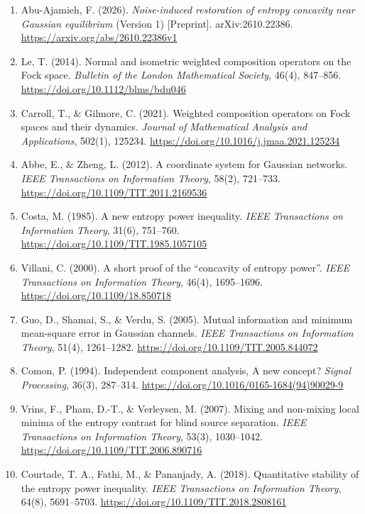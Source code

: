 \documentclass[
  british,
  10pt,
]{article}
\begin{document}
\begin{enumerate}
\item
  Abu-Ajamieh, F. (2026). \emph{Noise-induced restoration of entropy
  concavity near Gaussian equilibrium} (Version 1) {[}Preprint{]}.
  arXiv:2610.22386. \url{https://arxiv.org/abs/2610.22386v1}
\item
  Le, T. (2014). Normal and isometric weighted composition operators on
  the Fock space. \emph{Bulletin of the London Mathematical Society},
  46(4), 847--856. \url{https://doi.org/10.1112/blms/bdu046}
\item
  Carroll, T., \& Gilmore, C. (2021). Weighted composition operators on
  Fock spaces and their dynamics. \emph{Journal of Mathematical Analysis
  and Applications}, 502(1), 125234.
  \url{https://doi.org/10.1016/j.jmaa.2021.125234}
\item
  Abbe, E., \& Zheng, L. (2012). A coordinate system for Gaussian
  networks. \emph{IEEE Transactions on Information Theory}, 58(2),
  721--733. \url{https://doi.org/10.1109/TIT.2011.2169536}
\item
  Costa, M. (1985). A new entropy power inequality. \emph{IEEE
  Transactions on Information Theory}, 31(6), 751--760.
  \url{https://doi.org/10.1109/TIT.1985.1057105}
\item
  Villani, C. (2000). A short proof of the ``concavity of entropy
  power''. \emph{IEEE Transactions on Information Theory}, 46(4),
  1695--1696. \url{https://doi.org/10.1109/18.850718}
\item
  Guo, D., Shamai, S., \& Verdu, S. (2005). Mutual information and
  minimum mean-square error in Gaussian channels. \emph{IEEE
  Transactions on Information Theory}, 51(4), 1261--1282.
  \url{https://doi.org/10.1109/TIT.2005.844072}
\item
  Comon, P. (1994). Independent component analysis, A new concept?
  \emph{Signal Processing}, 36(3), 287--314.
  \url{https://doi.org/10.1016/0165-1684(94)90029-9}
\item
  Vrins, F., Pham, D.-T., \& Verleysen, M. (2007). Mixing and non-mixing
  local minima of the entropy contrast for blind source separation.
  \emph{IEEE Transactions on Information Theory}, 53(3), 1030--1042.
  \url{https://doi.org/10.1109/TIT.2006.890716}
\item
  Courtade, T. A., Fathi, M., \& Pananjady, A. (2018). Quantitative
  stability of the entropy power inequality. \emph{IEEE Transactions on
  Information Theory}, 64(8), 5691--5703.
  \url{https://doi.org/10.1109/TIT.2018.2808161}
\end{enumerate}
\end{document}
